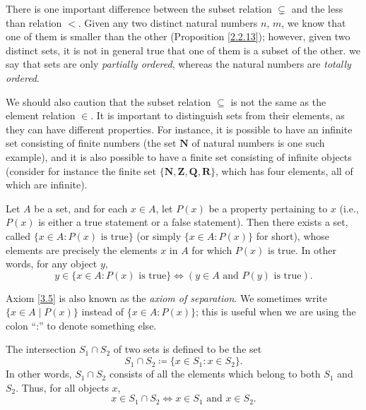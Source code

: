 \setcounter{theorem}{19}
\begin{remark}\label{3.1.20}
There is one important difference between the subset relation \(\subsetneq\) and the less than relation \(<\).
Given any two distinct natural numbers \(n\), \(m\), we know that one of them is smaller than the other (Proposition \ref{2.2.13});
however, given two distinct sets, it is not in general true that one of them is a subset of the other.
we say that sets are only \emph{partially ordered}, whereas the natural numbers are \emph{totally ordered}.
\end{remark}

\begin{remark}\label{3.1.21}
We should also caution that the subset relation \(\subseteq\) is not the same as the element relation \(\in\).
It is important to distinguish sets from their elements, as they can have different properties.
For instance, it is possible to have an infinite set consisting of finite numbers (the set \(\mathbf{N}\) of natural numbers is one such example), and it is also possible to have a finite set consisting of infinite objects
(consider for instance the finite set \(\{\mathbf{N}, \mathbf{Z}, \mathbf{Q}, \mathbf{R}\}\), which has four elements, all of which are infinite).
\end{remark}

\begin{axiom}\label{3.5}
Let \(A\) be a set, and for each \(x \in A\), let \(P(x)\) be a property pertaining to \(x\) (i.e., \(P(x)\) is either a true statement or a false statement).
Then there exists a set, called \(\{x \in A : P(x) \text{ is true}\}\) (or simply \(\{x \in A : P(x)\}\) for short), whose elements are precisely the elements \(x\) in \(A\) for which \(P(x)\) is true.
In other words, for any object \(y\),
\[
    y \in \{x \in A : P(x) \text{ is true}\} \iff (y \in A \text{ and } P(y) \text{ is true}).
\]
\end{axiom}

\begin{note}
Axiom \ref{3.5} is also known as the \emph{axiom of separation}.
We sometimes write \(\{x \in A \mid P(x)\}\) instead of \(\{x \in A : P(x)\}\);
this is useful when we are using the colon ``:'' to denote something else.
\end{note}

\setcounter{theorem}{22}
\begin{definition}[Intersections]\label{3.1.23}
The intersection \(S_1 \cap S_2\) of two sets is defined to be the set
\[
    S_1 \cap S_2 \coloneqq \{x \in S_1 : x \in S_2\}.
\]
In other words, \(S_1 \cap S_2\) consists of all the elements which belong to both \(S_1\) and \(S_2\).
Thus, for all objects \(x\),
\[
    x \in S_1 \cap S_2 \iff x \in S_1 \text{ and } x \in S_2.
\]
\end{definition}


